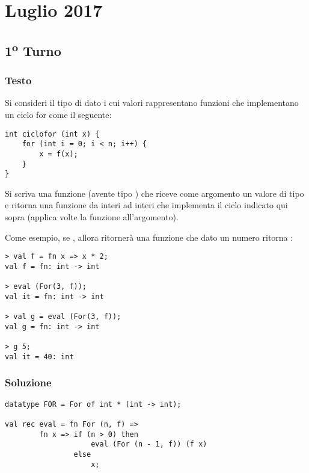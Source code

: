 \section{Luglio 2017}

\subsection{1\textsuperscript{o} Turno}

\subsubsection{Testo}

Si consideri il tipo di dato  i cui valori  rappresentano funzioni che implementano un ciclo for come il seguente:

\begin{lstlisting}
int ciclofor (int x) {
	for (int i = 0; i < n; i++) {
		x = f(x);
	}
}
\end{lstlisting}

Si scriva una funzione  (avente tipo ) che riceve come argomento un valore di tipo  e ritorna una funzione da interi ad interi che implementa il ciclo indicato qui sopra (applica  volte la funzione  all'argomento).

\medskip
Come esempio, se , allora  ritornerà una funzione che dato un numero  ritorna :

\begin{lstlisting}[style = SML]
> val f = fn x => x * 2;
val f = fn: int -> int

> eval (For(3, f));
val it = fn: int -> int

> val g = eval (For(3, f));
val g = fn: int -> int

> g 5;
val it = 40: int
\end{lstlisting}

\subsubsection{Soluzione}

\begin{lstlisting}[style = SML, caption = {definizione della funzione \sml{eval}}]
datatype FOR = For of int * (int -> int);

val rec eval = fn For (n, f) =>
		fn x => if (n > 0) then
					eval (For (n - 1, f)) (f x)
				else
					x;
\end{lstlisting}

